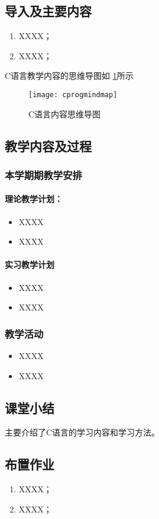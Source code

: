 \subsection{导入及主要内容}
\begin{enumerate}[\hspace{2em}1、]
  \item XXXX；
  \item XXXX；
\end{enumerate}
C语言教学内容的思维导图如 \ref{fig-cmindmap}所示
\begin{figure}[!hbtp]   
        \texttt{[image: cprogmindmap]} 
        \caption{C语言内容思维导图}\label{fig-cmindmap}
\end{figure}

\subsection{教学内容及过程}
  \subsubsection{本学期期教学安排} %
    \paragraph{理论教学计划：}%
    \begin{itemize}
      \item XXXX
      \item XXXX
    \end{itemize}
    \paragraph{实习教学计划}
    \begin{itemize}
      \item XXXX
      \item XXXX
    \end{itemize}
  \subsubsection{教学活动} 
  \begin{itemize}
    \item XXXX
    \item XXXX
  \end{itemize}

\subsection{课堂小结}
主要介绍了C语言的学习内容和学习方法。\vfill

\subsection{布置作业}
\begin{enumerate}[1、]
  \item XXXX；
  \item XXXX；
\end{enumerate}

\vfill

